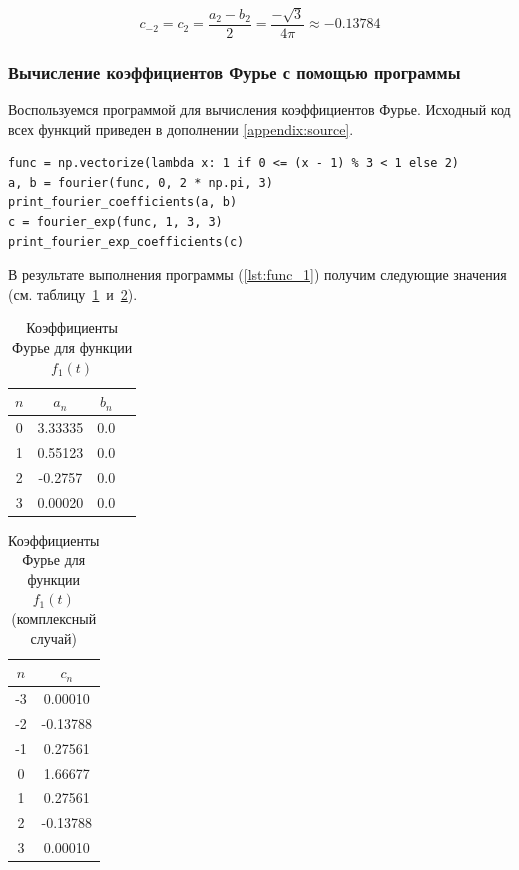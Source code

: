 \begin{equation}
    c_{-2} = c_2 = \frac{a_2 - b_2}{2} = \frac{-\sqrt{3}}{4\pi} \approx -0.13784
\end{equation}

\subsubsection{Вычисление коэффициентов Фурье с помощью программы}
Воспользуемся программой для вычисления коэффициентов Фурье. Исходный код всех функций приведен в дополнении \ref{appendix:source}.

\begin{lstlisting}[style=python_white, caption=Вычисление коэффициентов Фурье, label=lst:func_1]
func = np.vectorize(lambda x: 1 if 0 <= (x - 1) % 3 < 1 else 2)
a, b = fourier(func, 0, 2 * np.pi, 3)
print_fourier_coefficients(a, b)
c = fourier_exp(func, 1, 3, 3)
print_fourier_exp_coefficients(c)
\end{lstlisting}

В результате выполнения программы (\ref{lst:func_1}) получим следующие значения (см. таблицу~\ref{tab:func_1}~и~\ref{tab:func_1_exp}).

\begin{table}[ht!]
    \centering
    \begin{tabular}{|c|c|c|c|}
        \hline
        $n$ & $a_n$ & $b_n$ \\
        \hline
        0 & 3.33335 & 0.0 \\
        1 & 0.55123 & 0.0 \\
        2 & -0.2757 & 0.0 \\
        3 & 0.00020 & 0.0 \\
        \hline
    \end{tabular}
    \caption{Коэффициенты Фурье для функции $f_1(t)$}
    \label{tab:func_1}
\end{table}

\begin{table}[ht!]
    \centering
    \begin{tabular}{|c|c|}
        \hline
        $n$ & $c_n$ \\
        \hline
        -3 & 0.00010 \\
        -2 & -0.13788 \\
        -1 & 0.27561 \\
        0 & 1.66677 \\
        1 & 0.27561 \\
        2 & -0.13788 \\
        3 & 0.00010 \\
        \hline
    \end{tabular}
    \caption{Коэффициенты Фурье для функции $f_1(t)$ (комплексный случай)}
    \label{tab:func_1_exp}
\end{table}

